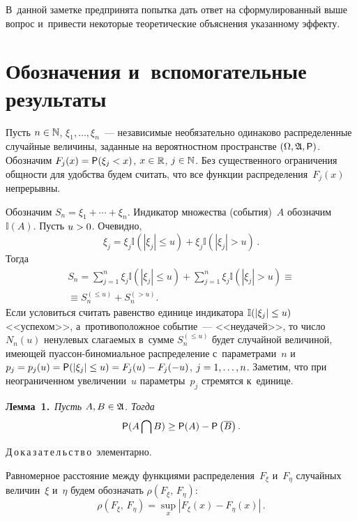 \begin{multicols}{2}
 В~данной заметке предпринята 
 попытка дать ответ на сформулированный выше вопрос и~привести некоторые теоретические объяснения 
 указанному эффекту.


\section{Обозначения и~вспомогательные результаты}


Пусть $n\hm\in\mathbb{N}$, $\xi_1,\ldots,\xi_n$~--- независимые необязательно одинаково 
распределенные случайные величины, заданные на вероятностном пространстве 
$(\Omega,\mathfrak{A},{\sf P})$. Обозначим $F_j(x)\hm={\sf P}(\xi_j<x)$, $x\hm\in\mathbb{R}$, 
$j\hm\in\mathbb{N}$. Без существенного ограничения общ\-ности для удобства будем считать, 
что все функции распределения~$F_j(x)$ непрерывны.

Обозначим $S_n=\xi_1+\cdots+\xi_n$. Индикатор множества (события)~$A$ обозначим $\mathbb{I}(A)$. 
Пусть $u\hm>0$. Очевидно, 
$$
\xi_j=\xi_j\mathbb{I}\left(|\xi_j|\le u\right)+\xi_j\mathbb{I}\left(|\xi_j|> u\right)\,.
$$
 Тогда
\begin{multline*}
S_n=\sum\limits_{j=1}^n \xi_j\mathbb{I}(|\xi_j|\le u)+\sum\limits_{j=1}^n \xi_j\mathbb{I}(|\xi_j|> u)\equiv{}\\
{}\equiv
S_n^{(\le u)}+S_n^{(> u)}.
\end{multline*}
Если условиться считать равенство единице индикатора $\mathbb{I}(|\xi_j|\hm\le u)$ <<успехом>>, 
а~противоположное событие~--- <<неудачей>>, то число~$N_n(u)$ ненулевых слагаемых в~сумме 
$S_n^{(\le u)}$ будет случайной величиной, имеющей пуас\-сон-би\-но\-ми\-аль\-ное распределение 
с~па\-ра\-мет\-ра\-ми~$n$ и~$p_j\hm=p_j(u)\hm={\sf P}(|\xi_j|\hm\le u)\hm=F_j(u)\hm-F_j(-u)$, 
$j\hm=1,\ldots,n$. Заметим, что при неограниченном увеличении~$u$ параметры~$p_j$ стремятся к~единице.

\smallskip

\noindent
\textbf{Лемма~1.}\ \textit{Пусть $A,B\hm\in\mathfrak{A}$. Тогда} 
$$
{\sf P}(A\bigcap B)\ge{\sf P}(A) -{\sf P}\left(\overline{B}\right).
$$


\noindent
Д\,о\,к\,а\,з\,а\,т\,е\,л\,ь\,с\,т\,в\,о\  элементарно.

\smallskip

Равномерное расстояние между функциями распределения~$F_{\xi}$ и~$F_{\eta}$ случайных величин~$\xi$ 
и~$\eta$ будем обозначать $\rho(F_{\xi},\,F_{\eta})$: 
$$
\rho(F_{\xi},\,F_{\eta})= \sup\limits_x\left\vert F_{\xi}(x)-F_{\eta}(x)\right\vert\,.
$$


\end{multicols}
